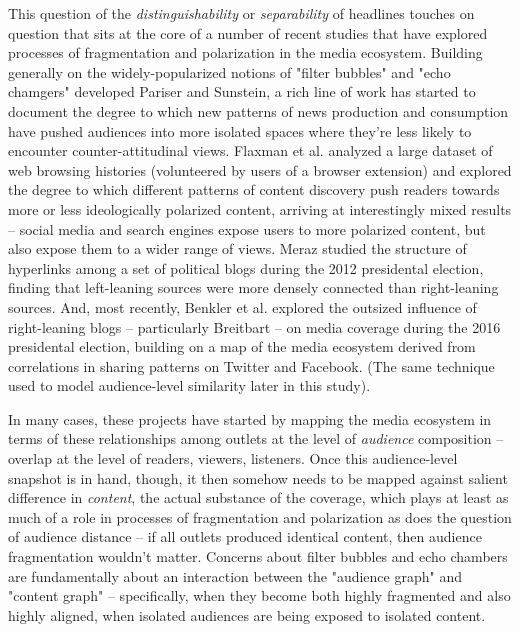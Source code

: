 \documentclass{scrartcl}
\begin{document}
This question of the \textit{distinguishability} or \textit{separability} of headlines touches on question that sits at the core of a number of recent studies that have explored processes of fragmentation and polarization in the media ecosystem. Building generally on the widely-popularized notions of "filter bubbles" and "echo chamgers" developed Pariser\cite{pariser2011filter} and Sunstein,\cite{sunstein2003republic} a rich line of work has started to document the degree to which new patterns of news production and consumption have pushed audiences into more isolated spaces where they're less likely to encounter counter-attitudinal views. Flaxman et al. analyzed a large dataset of web browsing histories (volunteered by users of a browser extension) and explored the degree to which different patterns of content discovery push readers towards more or less ideologically polarized content, arriving at interestingly mixed results -- social media and search engines expose users to more polarized content, but also expose them to a wider range of views.\cite{flaxman2016filter} Meraz studied the structure of hyperlinks among a set of political blogs during the 2012 presidental election, finding that left-leaning sources were more densely connected than right-leaning sources.\cite{meraz2015quantifying} And, most recently, Benkler et al. explored the outsized influence of right-leaning blogs -- particularly Breitbart -- on media coverage during the 2016 presidental election, building on a map of the media ecosystem derived from correlations in sharing patterns on Twitter and Facebook.\cite{benkler2017study} (The same technique used to model audience-level similarity later in this study).

In many cases, these projects have started by mapping the media ecosystem in terms of these relationships among outlets at the level of \textit{audience} composition -- overlap at the level of readers, viewers, listeners. Once this audience-level snapshot is in hand, though, it then somehow needs to be mapped against salient difference in \textit{content}, the actual substance of the coverage, which plays at least as much of a role in processes of fragmentation and polarization as does the question of audience distance -- if all outlets produced identical content, then audience fragmentation wouldn't matter. Concerns about filter bubbles and echo chambers are fundamentally about an interaction between the "audience graph" and "content graph" -- specifically, when they become both highly fragmented and also highly aligned, when isolated audiences are being exposed to isolated content.
\end{document}
